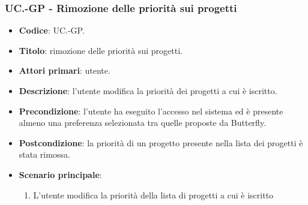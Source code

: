     \subsubsection{UC\theuccount.\thesubuccount-GP - Rimozione delle priorità sui progetti}
    
    \begin{itemize}
        \item \textbf{Codice}: UC\theuccount.\thesubuccount-GP.
        \item \textbf{Titolo}: rimozione delle priorità sui progetti.
        \item \textbf{Attori primari}: utente.
        \item \textbf{Descrizione}: l'utente modifica la priorità dei progetti a cui è iscritto.
        \item \textbf{Precondizione}: l’utente ha eseguito l'accesso nel sistema ed è presente almeno
        una preferenza selezionata tra quelle proposte da Butterfly.
        \item \textbf{Postcondizione}: la priorità di un progetto presente nella lista dei progetti è stata rimossa.
        \item \textbf{Scenario principale}:
        \begin{enumerate}
            \item L'utente modifica la priorità della lista di progetti a cui è iscritto
        \end{enumerate}
    \end{itemize}
